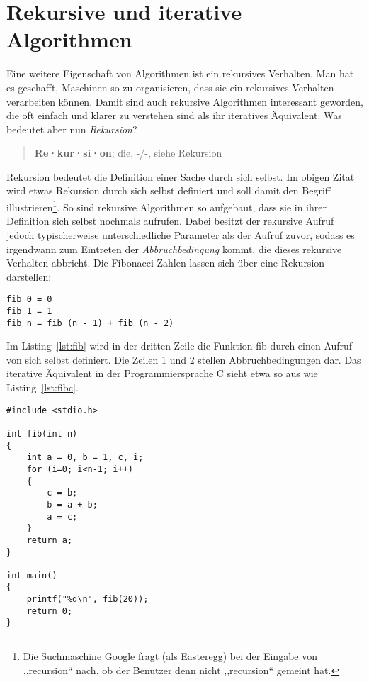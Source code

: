 \section{Rekursive und iterative Algorithmen}
%
Eine weitere Eigenschaft von Algorithmen ist ein rekursives Verhalten. Man hat es geschafft, Maschinen so zu organisieren, dass sie ein rekursives Verhalten verarbeiten können. Damit sind auch rekursive Algorithmen interessant geworden, die oft einfach und klarer zu verstehen sind als ihr iteratives Äquivalent. Was bedeutet aber nun \emph{Rekursion}?

\begin{quote}
   \textbf{Re·kur·si·on}; die, -/-, siehe Rekursion
\end{quote}

Rekursion bedeutet die Definition einer Sache durch sich selbst. Im obigen Zitat wird etwas Rekursion durch sich selbst definiert und soll damit den Begriff illustrieren\footnote{Die Suchmaschine Google fragt (als Easteregg) bei der Eingabe von ,,recursion`` nach, ob der Benutzer denn nicht ,,recursion`` gemeint hat.}. So sind rekursive Algorithmen so aufgebaut, dass sie in ihrer Definition sich selbst nochmals aufrufen. Dabei besitzt der rekursive Aufruf jedoch typischerweise unterschiedliche Parameter als der Aufruf zuvor, sodass es irgendwann zum Eintreten der \emph{Abbruchbedingung} kommt, die dieses rekursive Verhalten abbricht. Die Fibonacci-Zahlen lassen sich über eine Rekursion darstellen:

\begin{lstlisting}
fib 0 = 0
fib 1 = 1
fib n = fib (n - 1) + fib (n - 2)
\end{lstlisting}

Im Listing~\ref{lst:fib} wird in der dritten Zeile die Funktion fib durch einen Aufruf von sich selbst definiert. Die Zeilen 1 und 2 stellen Abbruchbedingungen dar. Das iterative Äquivalent in der Programmiersprache C sieht etwa so aus wie Listing~\ref{lst:fibc}. %
%
\begin{lstlisting}
#include <stdio.h>

int fib(int n)
{
    int a = 0, b = 1, c, i;
    for (i=0; i<n-1; i++)
    {
        c = b;
        b = a + b;
        a = c;
    }
    return a;
}

int main()
{
    printf("%d\n", fib(20));
    return 0;
}
\end{lstlisting}
%
